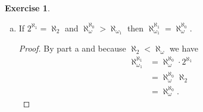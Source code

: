 \documentclass{article}
\theoremstyle{definition}
\newtheorem{question}{Exercise}
\DeclareMathOperator{\cof}{cf}
\begin{document}
\begin{question}
\begin{enumerate}[a.]
\begin{proof}
                  If \(\aleph<\omega\) is a successor ordinal then we can apply
                  the Haussdorff formula finitely many times to obtain the
                  following inequality:
                  \begin{align*}
                      \aleph_{\omega}^{\aleph_{1}} & \leq\aleph_{\alpha}^{\aleph_{1}}                                        \\
                                                   & =\aleph_{0}^{\aleph_{1}}\cdot\prod_{1\leq\beta\leq\alpha}\aleph_{\beta} \\
                                                   & =\aleph_{0}^{\aleph_{1}}\cdot\aleph_{\alpha}.
                  \end{align*}
                  However because \(\aleph_{\alpha}<\aleph_{\omega}\) we must
                  get
                  \(\aleph_{\omega}^{\aleph_{1}}\leq\aleph_{0}^{\aleph_{1}}\).
                  Applying the same permutation of
                  Bernstein-Schröder-Dedekind-Cantor in the same manner as
                  before gives the same desired equality:
                  \(\aleph_{\omega}^{\aleph_{1}}=\aleph_{\omega}^{\aleph_{0}}\cdot
                  2^{\aleph_{1}}\).

                  In the latter case we have
                  \(\aleph_{\alpha}^{\aleph_{1}}<\aleph_{\omega}\) for all
                  \(\alpha<\omega\). Then for the cofinality we have the
                  following inequality:
                  \(\cof(\aleph_{\omega})=\aleph_{0}\leq\aleph_{1}\). This means
                  that
                  \(\aleph_{\omega}^{\aleph_{1}}=\aleph_{\omega}^{\aleph_{0}}\).
                  Combining this with the inequality of  we
                  obtain the desired equality in this case:
                  \(\aleph_{\omega}^{\aleph_{1}}=\aleph_{\omega}^{\aleph_{0}}\cdot
                  2^{\aleph_{1}}\).
              \end{proof}

        \item If \(2^{\aleph_{1}}=\aleph_{2}\) and
              \(\aleph_{\omega}^{\aleph_{0}}>\aleph_{\omega_{1}}\) then
              \(\aleph_{\omega_{1}}^{\aleph_{1}}=\aleph_{\omega}^{\aleph_{0}}\).

              \begin{proof}
                  By part a and because \(\aleph_{2}<\aleph_{\omega}\) we have
                  \begin{align*}
                      \aleph_{\omega_{1}}^{\aleph_{1}} & =\aleph_{\omega}^{\aleph_{0}}\cdot 2^{\aleph_{1}} \\
                                                       & =\aleph_{\omega}^{\aleph_{0}}\aleph_{2}           \\
                                                       & =\aleph_{\omega}^{\aleph_{0}}.
                  \end{align*}
              \end{proof}


\end{enumerate}
\end{question}
\end{document}
